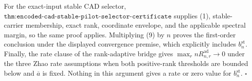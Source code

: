 For the exact-input stable CAD selector, \(\texttt{thm:encoded-cad-stable-pilot-selector-certificate}\) supplies (1), stable-carrier membership, exact rank, coordinate envelope, and the applicable spectral margin, so the same proof applies.  Multiplying (9) by \(n\) proves the first-order conclusion under the displayed convergence premise, which explicitly includes \(b_n^{\mathrm{st}}\).  Finally, the rate clause of the rank-adaptive bridge gives \(\max_r nR_{n,r}^{\mathrm{ad}}\to0\) under the three Zhao rate assumptions when both positive-rank thresholds are bounded below and \(\overline a\) is fixed.  Nothing in this argument gives a rate or zero value for \(b_n^{\mathrm{st}}\). \(\square\)